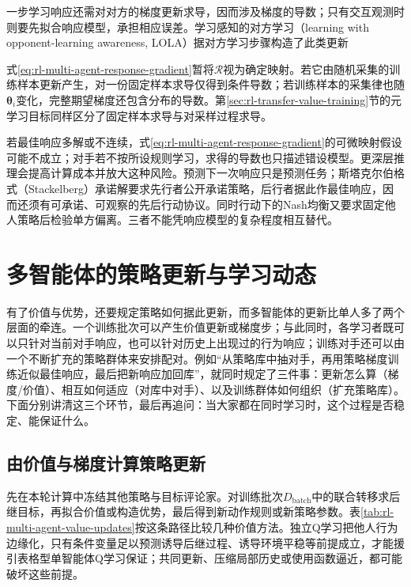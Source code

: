 一步学习响应还需对对方的梯度更新求导，因而涉及梯度的导数；只有交互观测时则要先拟合响应模型，承担相应误差。学习感知的对方学习（learning with opponent-learning awareness, LOLA）据对方学习步骤构造了此类更新

式\eqref{eq:rl-multi-agent-response-gradient}暂将$\mathcal R$视为确定映射。若它由随机采集的训练样本更新产生，对一份固定样本求导仅得到条件导数；若训练样本的采集律也随$\bm\theta_i$变化，完整期望梯度还包含分布的导数。第\ref{sec:rl-transfer-value-training}节的元学习目标同样区分了固定样本求导与对采样过程求导。

若最佳响应多解或不连续，式\eqref{eq:rl-multi-agent-response-gradient}的可微映射假设可能不成立；对手若不按所设规则学习，求得的导数也只描述错设模型。更深层推理会提高计算成本并放大这种风险。预测下一次响应只是预测任务；斯塔克尔伯格式（Stackelberg）承诺解要求先行者公开承诺策略，后行者据此作最佳响应，因而还须有可承诺、可观察的先后行动协议。同时行动下的Nash均衡又要求固定他人策略后检验单方偏离。三者不能凭响应模型的复杂程度相互替代。

\section{多智能体的策略更新与学习动态}
\label{sec:rl-multi-agent-learning}

有了价值与优势，还要规定策略如何据此更新，而多智能体的更新比单人多了两个层面的牵连。一个训练批次可以产生价值更新或梯度步；与此同时，各学习者既可以只针对当前对手响应，也可以针对历史上出现过的行为响应；训练对手还可以由一个不断扩充的策略群体来安排配对。例如“从策略库中抽对手，再用策略梯度训练近似最佳响应，最后把新响应加回库”，就同时规定了三件事：更新怎么算（梯度/价值）、相互如何适应（对库中对手）、以及训练群体如何组织（扩充策略库）。下面分别讲清这三个环节，最后再追问：当大家都在同时学习时，这个过程是否稳定、能保证什么。

\subsection{由价值与梯度计算策略更新}
\label{sec:rl-multi-agent-update}

先在本轮计算中冻结其他策略与目标评论家。对训练批次$D_{\mathrm{batch}}$中的联合转移求后继目标，再拟合价值或构造优势，最后得到新动作规则或新策略参数。表\ref{tab:rl-multi-agent-value-updates}按这条路径比较几种价值方法。独立Q学习把他人行为边缘化，只有条件变量足以预测诱导后继过程、诱导环境平稳等前提成立，才能援引表格型单智能体Q学习保证；共同更新、压缩局部历史或使用函数逼近，都可能破坏这些前提。

